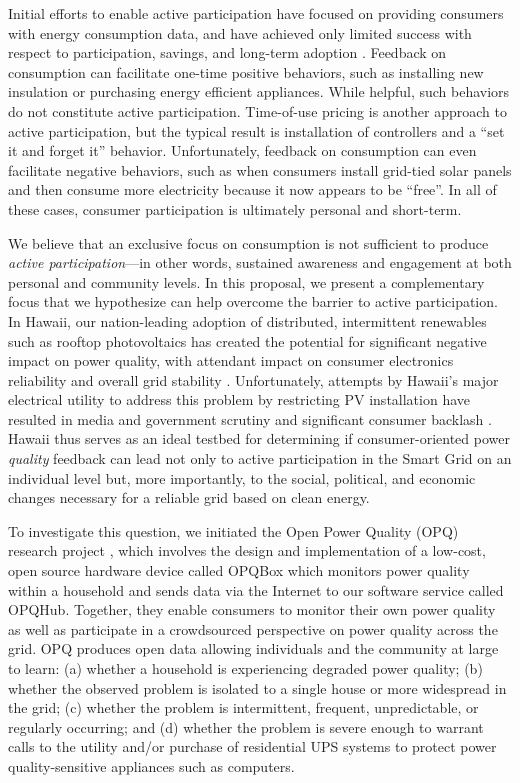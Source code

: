 Initial efforts to enable active participation have focused on providing consumers with energy consumption data, and have achieved only limited success with respect to participation, savings, and long-term adoption \cite{Darby06,Faruqui09,Foster2012}.  Feedback on consumption can facilitate one-time positive behaviors, such as installing new insulation or purchasing energy efficient appliances. While helpful, such behaviors do not constitute active participation.    Time-of-use pricing is another approach to active participation, but the typical result is installation of controllers and a ``set it and forget it'' behavior.  Unfortunately, feedback on consumption can even facilitate negative behaviors, such as when consumers install grid-tied solar panels and then consume more electricity because it now appears to be ``free''.  In all of these cases, consumer participation is ultimately personal and short-term.

We believe that an exclusive focus on consumption is not sufficient to produce {\em active participation}---in other words, sustained awareness and engagement at both personal and community levels. In this proposal, we present a complementary focus that we hypothesize can help overcome the barrier to active participation.  In Hawaii, our nation-leading adoption of distributed, intermittent renewables such as rooftop photovoltaics has created the potential for significant negative impact on power quality, with attendant impact on consumer electronics reliability and overall grid stability \cite{Rodriguez2010,Laskar2012}. Unfortunately, attempts by Hawaii's major electrical utility to address this problem by restricting PV installation have resulted in media and government scrutiny and significant consumer backlash \cite{Yonan2013,Zunin2013,Elston2013,Cocke2013,Cocke2012}.  Hawaii thus serves as an ideal testbed for determining if consumer-oriented power {\em quality} feedback can lead not only to active participation in the Smart Grid on an individual level but, more importantly, to the social, political, and economic changes necessary for a reliable grid based on clean energy.

To investigate this question, we initiated the Open Power Quality (OPQ) research project \cite{opq-site}, which involves the design and implementation of a low-cost, open source hardware device called OPQBox which monitors power quality within a household and sends data via the Internet to our software service called OPQHub. Together, they enable consumers to monitor their own power quality as well as participate in a crowdsourced perspective on power quality across the grid.  OPQ produces open data allowing individuals and the community at large to learn: (a) whether a household is experiencing degraded power quality; (b) whether the observed problem is isolated to a single house or more widespread in the grid;  (c) whether the problem is intermittent, frequent, unpredictable, or regularly occurring;  and (d) whether the problem is severe enough to warrant calls to the utility and/or purchase of residential UPS systems to protect power quality-sensitive appliances such as computers. 

